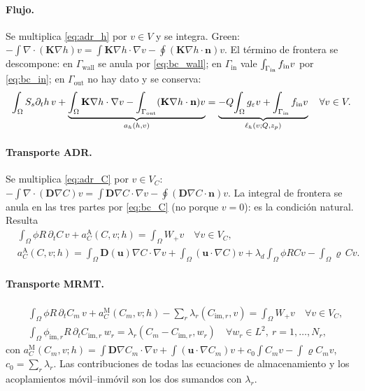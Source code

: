 \documentclass[11pt]{article}
\numberwithin{equation}{section}
\theoremstyle{remark}
\newcommand{\bu}{\mathbf{u}}
\newcommand{\bK}{\mathbf{K}}
\newcommand{\bD}{\mathbf{D}}
\newcommand{\bn}{\mathbf{n}}
\newcommand{\geps}{g_\varepsilon}
\newcommand{\im}{\mathrm{im}}
\newcommand{\vr}{\varrho}              %
\newcommand{\Gin}{\Gamma_{\mathrm{in}}}
\newcommand{\Gout}{\Gamma_{\mathrm{out}}}
\newcommand{\Gwall}{\Gamma_{\mathrm{wall}}}
\begin{document}
\paragraph{Flujo.} Se multiplica \eqref{eq:adr_h} por $v\in V$ y se integra. Green: $-\int\nabla\!\cdot(\bK\nabla h)v=\int\bK\nabla h\cdot\nabla v-\oint(\bK\nabla h\cdot\bn)v$.
El t\'ermino de frontera se descompone: en $\Gwall$ se anula por \eqref{eq:bc_wall}; en $\Gin$ vale $\int_{\Gin}f_{\rm in}v$ por \eqref{eq:bc_in}; en $\Gout$ no hay dato y se
conserva:
\begin{equation}
\int_\Omega S_s\partial_th\,v+\underbrace{\int_\Omega\bK\nabla h\cdot\nabla v-\int_{\Gout}(\bK\nabla h\cdot\bn)v}_{a_h(h,v)}
=\underbrace{-Q\!\int_\Omega\geps v+\int_{\Gin}f_{\rm in}v}_{\ell_h(v;Q,z_p)}\quad\forall v\in V .
\label{eq:debil_h}
\end{equation}

\paragraph{Transporte ADR.} Se multiplica \eqref{eq:adr_C} por $v\in V_C$:
$-\int\nabla\!\cdot(\bD\nabla C)v=\int\bD\nabla C\cdot\nabla v-\oint(\bD\nabla C\cdot\bn)v$. La integral de frontera se anula en las tres partes por \eqref{eq:bc_C}
(no porque $v=0$): es la condici\'on natural. Resulta
\begin{equation}
\begin{aligned}
&\int_\Omega\phi R\,\partial_tC\,v+a_C^{\mathrm A}(C,v;h)=\int_\Omega W_+v\quad\forall v\in V_C,\\
&a_C^{\mathrm A}(C,v;h)=\int_\Omega\bD(\bu)\nabla C\cdot\nabla v+\int_\Omega(\bu\cdot\nabla C)v+\lambda_d\!\int_\Omega\phi RCv-\int_\Omega\vr\,Cv .
\end{aligned}
\label{eq:debil_adr}
\end{equation}

\paragraph{Transporte MRMT.}
\begin{equation}
\begin{aligned}
&\int_\Omega\phi R\,\partial_tC_m\,v+a_C^{\mathrm M}(C_m,v;h)-\sum_r\lambda_r(C_{\im,r},v)=\int_\Omega W_+v\quad\forall v\in V_C,\\
&\int_\Omega\phi_{\im,r}R\,\partial_tC_{\im,r}\,w_r=\lambda_r(C_m-C_{\im,r},w_r)\quad\forall w_r\in L^2,\ r=1,\dots,N_r,
\end{aligned}
\label{eq:debil_mrmt}
\end{equation}
con $a_C^{\mathrm M}(C_m,v;h)=\int\bD\nabla C_m\cdot\nabla v+\int(\bu\cdot\nabla C_m)v+c_0\!\int C_mv-\int\vr C_mv$, $c_0=\sum_r\lambda_r$.
Las contribuciones de todas las ecuaciones de almacenamiento y los acoplamientos m\'ovil--inm\'ovil son los dos sumandos con $\lambda_r$.
\end{document}
